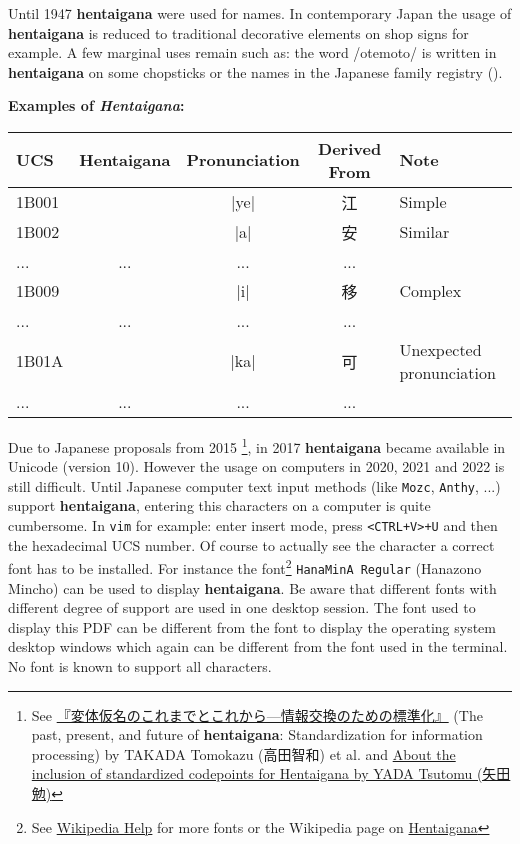 Until 1947 \textbf{hentaigana} were used for names. In contemporary Japan the usage
of \textbf{hentaigana} is reduced to traditional decorative elements on shop signs
for example. A few marginal uses remain such as: the word /otemoto/ is written
in \textbf{hentaigana} on some chopsticks or the names in the Japanese family
registry (\lkoseki{}).

\bigskip

\textbf{Examples of \textit{Hentaigana}:}

\begin{center}
\JapaneseFontN
\begin{tabular}{lcccl}
\textbf{UCS}&\textbf{Hentaigana}&\textbf{Pronunciation}&\textbf{Derived From}&\textbf{Note} \\\hline
1B001& 𛀁 & |ye|& 江  & Simple \\
1B002& 𛀂 & |a| & 安  & Similar \\
...  &... &...  &...  & \\
1B009& 𛀉   & |i|  & 移  & Complex \\
...  &... &...  &...  & \\
1B01A& 𛀚 &|ka| & 可  & Unexpected pronunciation \\
...  &... &...  &...  & \\
\end{tabular}
\JapaneseDefault
\end{center}

Due to Japanese proposals from 2015
\footnote{See
        \href{https://www.unicode.org/L2/L2015/15316-hentaigana-58_438.pdf}{『変体仮名のこれまでとこれから—情報交換のための標準化』}
(The past, present, and future of \textbf{hentaigana}: Standardization for
information processing) by TAKADA Tomokazu (高田智和) et al. and
\href{https://www.unicode.org/L2/L2015/15318-hentaigana.pdf}{About the
inclusion of standardized codepoints for Hentaigana by YADA Tsutomu (矢田勉)}
}, in 2017 \textbf{hentaigana} became available in Unicode (version 10).
However the usage on computers in 2020, 2021 and 2022 is still difficult. Until
Japanese computer text input methods (like \texttt{Mozc}, \texttt{Anthy}, ...)
support \textbf{hentaigana}, entering this characters on a computer is quite
cumbersome. In \texttt{vim} for example: enter insert mode, press
\texttt{<CTRL+V>+U} and then the hexadecimal UCS number. Of course to actually
see the character a correct font has to be installed. For instance the
font\footnote{See 
\href{https://en.wikipedia.org/wiki/Help:Multilingual_support\#Hentaigana}{Wikipedia Help}
for more fonts or the Wikipedia page on
\href{https://en.wikipedia.org/wiki/Hentaigana}{Hentaigana} } \texttt{HanaMinA
Regular} (Hanazono Mincho) can be used to display \textbf{hentaigana}. Be aware that
different fonts with different degree of support are used in one desktop
session. The font used to display this PDF can be different from the font to
display the operating system desktop windows which again can be different from
the font used in the terminal. No font is known to support all characters.

